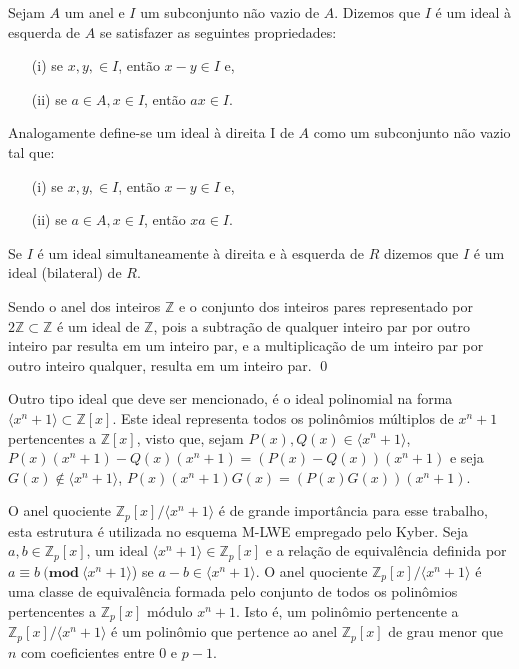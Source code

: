 \begin{definition}[ideais]
    Sejam $A$ um anel e $I$ um subconjunto não vazio de $A$.
    Dizemos que $I$ é um ideal à esquerda de $A$ se satisfazer as seguintes propriedades:
    
    \begin{enumerate}
        \item[(i)] se $x, y,  \in I$, então $x-y \in I$ e,
        \item[(ii)] se $a \in A, x \in I$, então $ax \in I$.
    \end{enumerate}
    
    Analogamente define-se um ideal à direita I de $A$ como um subconjunto não vazio tal que:
    
    \begin{enumerate}
        \item[(i)] se $x, y,  \in I$, então $x-y \in I$ e,
        \item[(ii)] se $a \in A, x \in I$, então $xa \in I$.
    \end{enumerate}
    
    Se $I$ é um ideal simultaneamente à direita e à esquerda de $R$ dizemos que $I$ é um ideal (bilateral) de $R$.
\end{definition}

    \begin{exemplo}
         Sendo o anel dos inteiros $\mathbb{Z}$ e o conjunto dos inteiros pares representado por $2\mathbb{Z} \subset \mathbb{Z}$ é um ideal de $\mathbb{Z}$, pois a subtração de qualquer inteiro par por outro inteiro par resulta em um inteiro par, e a multiplicação de um inteiro par por outro inteiro qualquer, resulta em um inteiro par. 
    \qed
    \end{exemplo}

    Outro tipo ideal que deve ser mencionado, é o ideal polinomial na forma $\langle x^{n} + 1 \rangle \subset \mathbb{Z}[x]$. Este ideal representa todos os polinômios múltiplos de $x^{n} + 1$ pertencentes a $\mathbb{Z}[x]$, visto que, sejam $P(x),Q(x) \in \langle x^{n} + 1 \rangle $, $P(x)(x^{n}+1) - Q(x)(x^{n}+1) = (P(x)-Q(x))(x^{n}+1)$ e seja $G(x) \notin \langle x^{n} + 1 \rangle$, $P(x)(x^{n}+1)G(x) = (P(x)G(x))(x^{n}+1)$.

    O anel quociente $\mathbb{Z}_p[x] / \langle x^n+1 \rangle$ é de grande importância para esse trabalho, esta estrutura é utilizada no esquema M-LWE empregado pelo Kyber. Seja $a,b \in \mathbb{Z}_p[x]$, um ideal $\langle x^n+1 \rangle \in \mathbb{Z}_p[x]$ e a relação de equivalência definida por $a \equiv b\ (\textbf{mod}\ \langle x^n+1 \rangle$) se $a - b \in \langle x^n+1 \rangle$. O anel quociente $\mathbb{Z}_p[x] / \langle x^n+1 \rangle$ é uma classe de equivalência formada pelo conjunto de todos os polinômios pertencentes a $\mathbb{Z}_p[x]$ módulo $x^n+1$. Isto é, um polinômio pertencente a $\mathbb{Z}_p[x] / \langle x^n+1 \rangle$ é um polinômio que pertence ao anel $\mathbb{Z}_p[x]$ de grau menor que $n$ com coeficientes entre 0 e $p-1$.

